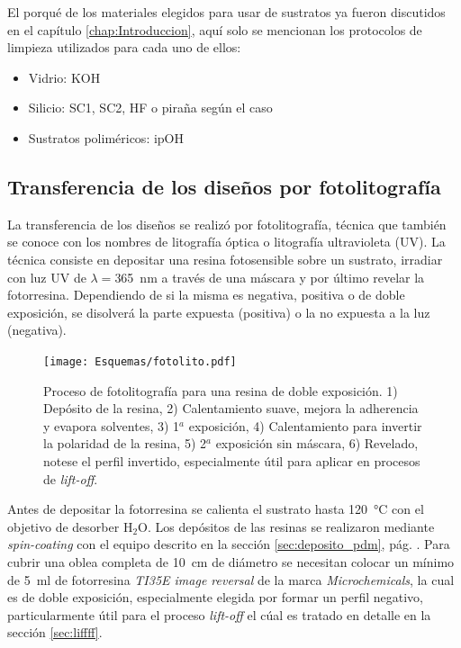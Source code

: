 			El porqué de los materiales elegidos para usar de sustratos ya fueron discutidos en el capítulo \ref{chap:Introduccion}, aquí solo se mencionan los protocolos de limpieza\cite{Franssila2004,Kern1990} utilizados para cada uno de ellos:

				\begin{itemize}
					\item{Vidrio: KOH}
					\item{Silicio: SC1, SC2, HF o piraña según el caso}
					\item{Sustratos poliméricos: ipOH}
				\end{itemize}

    \subsection{Transferencia de los diseños por fotolitografía}\label{sec:fotolito}

		La transferencia de los diseños se realizó por fotolitografía, técnica que también se conoce con los nombres de litografía óptica o litografía ultravioleta (UV). La técnica consiste en depositar una resina fotosensible sobre un sustrato, irradiar con luz UV de $\lambda\!=$\SI{365}{nm} a través de una máscara y por último revelar la fotorresina. Dependiendo de si la misma es negativa, positiva o de doble exposición, se disolverá la parte expuesta (positiva) o la no expuesta a la luz (negativa). \cite{Jaeger2001,Franssila2004,Mack2007,Mack2006}
				

			  \begin{figure}[b!]
			  \begin{center}
			  \texttt{[image: Esquemas/fotolito.pdf]}
			  \caption[Esquema fotolitografía]{Proceso de fotolitografía para una resina de doble exposición. 1) Depósito de la resina, 2) Calentamiento suave, mejora la adherencia y evapora solventes, 3) 1$^a$ exposición, 4) Calentamiento para invertir la polaridad de la resina, 5) 2$^a$ exposición sin máscara, 6) Revelado, notese el perfil invertido, especialmente útil para aplicar en procesos de\textit{ lift-off}.}
			  \label{esq:fotolito}
			  \end{center}
			  \end{figure}	

		Antes de depositar la fotorresina se calienta el sustrato hasta \SI{120}{\celsius} con el objetivo de desorber H$_2$O. Los depósitos de las resinas se realizaron mediante \textit{spin-coating} con el equipo descrito en la sección \ref{sec:deposito_pdm}, pág. \pageref{sec:deposito_pdm}. Para cubrir una oblea completa de \SI{10}{\cm} de diámetro se necesitan colocar un mínimo de \SI{5}{\ml} de fotorresina \textit{TI35E image reversal} de la marca \textit{Microchemicals}, la cual es de doble exposición, especialmente elegida por formar un perfil negativo, particularmente útil para el proceso \textit{lift-off} el cúal es tratado en detalle en la sección \ref{sec:liffff}.\cite{MicrochemicalsTeam2009} 
	
